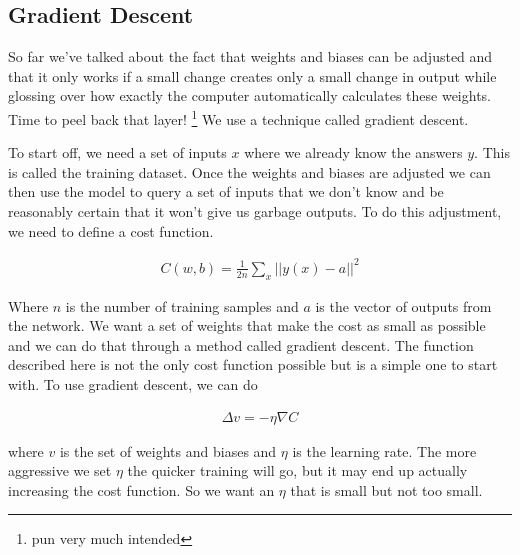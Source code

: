 \subsection{Gradient Descent}

So far we've talked about the fact that weights and biases can be adjusted and that it only works if a small change creates only a small change in output while glossing over how exactly the computer automatically calculates these weights.
Time to peel back that layer!
\footnote{pun very much intended}
We use a technique called gradient descent.

To start off, we need a set of inputs $x$ where we already know the answers $y$.
This is called the training dataset.
Once the weights and biases are adjusted we can then use the model to query a set of inputs that we don't know and be reasonably certain that it won't give us garbage outputs.
To do this adjustment, we need to define a cost function.

\begin{align}
  C(w,b) = \frac{1}{2n} \sum_x || y(x) - a||^2
\end{align}

Where $n$ is the number of training samples and $a$ is the vector of outputs from the network.
We want a set of weights that make the cost as small as possible and we can do that through a method called gradient descent.
The function described here is not the only cost function possible but is a simple one to start with.
To use gradient descent, we can do

\begin{align}
  \Delta v = - \eta \nabla C
\end{align}

where $v$ is the set of weights and biases and $\eta$ is the learning rate.
The more aggressive we set $\eta$ the quicker training will go, but it may end up actually increasing the cost function.
So we want an $\eta$ that is small but not too small.

